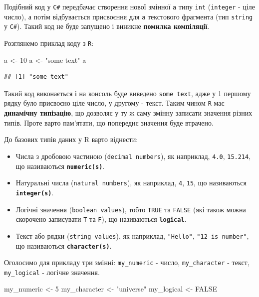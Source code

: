 \documentclass[
]{book}
\newenvironment{Shaded}{\begin{snugshade}}{\end{snugshade}}
\newcommand{\ConstantTok}[1]{\textcolor[rgb]{0.00,0.00,0.00}{#1}}
\newcommand{\DecValTok}[1]{\textcolor[rgb]{0.00,0.00,0.81}{#1}}
\newcommand{\NormalTok}[1]{#1}
\newcommand{\OtherTok}[1]{\textcolor[rgb]{0.56,0.35,0.01}{#1}}
\newcommand{\StringTok}[1]{\textcolor[rgb]{0.31,0.60,0.02}{#1}}
\providecommand{\tightlist}{%
  \setlength{\itemsep}{0pt}\setlength{\parskip}{0pt}}
\begin{document}
Подібний код у \texttt{C\#} передбачає створення нової змінної \texttt{a} типу \texttt{int} (\texttt{integer} - ціле число), а потім відбувається присвоєння для \texttt{a} текстового фрагмента (тип \texttt{string} у \texttt{С\#}). Такий код не буде запущено і виникне {\textbf{помилка компіляції}}.

Розглянемо приклад коду з \texttt{R}:

\begin{Shaded}
\begin{Highlighting}[]
\NormalTok{a }\OtherTok{\textless{}{-}} \DecValTok{10}
\NormalTok{a }\OtherTok{\textless{}{-}} \StringTok{"some text"}
\NormalTok{a}
\end{Highlighting}
\end{Shaded}

\begin{verbatim}
## [1] "some text"
\end{verbatim}

Такий код виконається і на консоль буде виведено \texttt{some\ text}, адже у 1 першому рядку було присвоєно ціле число, у другому - текст. Таким чином \texttt{R} має \textbf{динамічну типізацію}, що дозволяє у ту ж саму змінну записати значення різних типів. Проте варто пам'ятати, що попереднє значення буде втрачено.

До базових типів даних у R варто віднести:

\begin{itemize}
\tightlist
\item
  Числа з дробовою частиною (\texttt{decimal\ numbers}), як наприклад, \texttt{4.0}, \texttt{15.214}, що називаються \textbf{\texttt{numeric(s)}}.
\item
  Натуральні числа (\texttt{natural\ numbers}), як наприклад, \texttt{4}, \texttt{15}, що називаються \textbf{\texttt{integer(s)}}.
\item
  Логічні значення (\texttt{boolean\ values}), тобто \texttt{TRUE} та \texttt{FALSE} (які також можна скорочено записувати \texttt{T} та \texttt{F}), що називаються \textbf{\texttt{logical}}.
\item
  Текст або рядки (\texttt{string\ values}), як наприклад, \texttt{"Hello"}, \texttt{"12\ is\ number"}, що називаються \textbf{\texttt{character(s)}}.
\end{itemize}

Оголосимо для прикладу три змінні: \texttt{my\_numeric} - число, \texttt{my\_character} - текст, \texttt{my\_logical} - логічне значення.

\begin{Shaded}
\begin{Highlighting}[]
\NormalTok{my\_numeric }\OtherTok{\textless{}{-}} \DecValTok{5}
\NormalTok{my\_character }\OtherTok{\textless{}{-}} \StringTok{"universe"}
\NormalTok{my\_logical }\OtherTok{\textless{}{-}} \ConstantTok{FALSE}
\end{Highlighting}
\end{Shaded}
\end{document}
